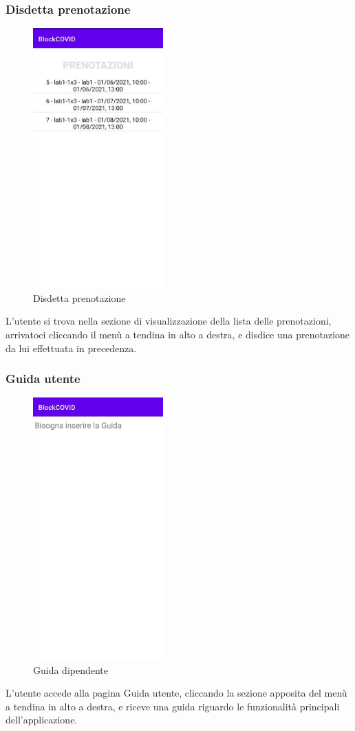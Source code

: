 	\subsubsection{Disdetta prenotazione}
	\begin{figure}[H]
		\centering
		\includegraphics[width=5cm]{res/images/VisualizzaPrenotazioni.png}
		\caption{Disdetta prenotazione}
	\end{figure}
	L’utente si trova nella sezione di visualizzazione della lista delle prenotazioni, arrivatoci cliccando il menù a tendina in alto a destra, e disdice una prenotazione da lui effettuata in precedenza.
	\subsubsection{Guida utente}
	\begin{figure}[H]
		\centering
		\includegraphics[width=5cm]{res/images/Guida.png}
		\caption{Guida dipendente}
	\end{figure}
	L’utente accede alla pagina Guida utente, cliccando la sezione apposita del menù a tendina in alto a destra, e riceve una guida riguardo le funzionalità principali dell'applicazione.

